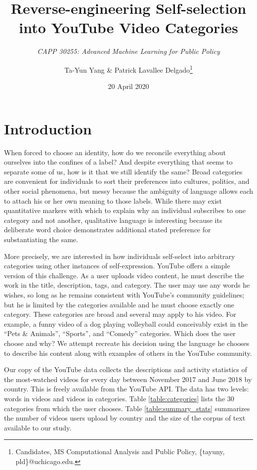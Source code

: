 \documentclass[letterpaper, 12pt]{article}
\title{Reverse-engineering Self-selection into YouTube Video Categories}
\subtitle{\textit{CAPP 30255: Advanced Machine Learning for Public Policy}}
\author{Ta-Yun Yang \& Patrick Lavallee Delgado\thanks{Candidates, MS Computational Analysis and Public Policy, \{tayuny, pld\}@uchicago.edu.}}
\date{20 April 2020}
\begin{document}
\maketitle

\section{Introduction}

When forced to choose an identity, how do we reconcile everything about ourselves into the confines of a label? And despite everything that seems to separate some of us, how is it that we still identify the same? Broad categories are convenient for individuals to sort their preferences into cultures, politics, and other social phenomena, but messy because the ambiguity of language allows each to attach his or her own meaning to those labels. While there may exist quantitative markers with which to explain why an individual subscribes to one category and not another, qualitative language is interesting because its deliberate word choice demonstrates additional stated preference for substantiating the same.

More precisely, we are interested in how individuals self-select into arbitrary categories using other instances of self-expression. YouTube offers a simple version of this challenge. As a user uploads video content, he must describe the work in the title, description, tags, and category. The user may use any words he wishes, so long as he remains consistent with YouTube's community guidelines; but he is limited by the categories available and he must choose exactly one category. These categories are broad and several may apply to his video. For example, a funny video of a dog playing volleyball could conceivably exist in the ``Pets $\&$ Animals'', ``Sports'', and ``Comedy'' categories. Which does the user choose and why? We attempt recreate his decision using the language he chooses to describe his content along with examples of others in the YouTube community.

Our copy of the YouTube data collects the descriptions and activity statistics of the most-watched videos for every day between November 2017 and June 2018 by country. This is freely available from the YouTube API. The data has two levels: words in videos and videos in categories. Table \ref{table:categories} lists the 30  categories from which the user chooses. Table \ref{table:summary_stats} summarizes the number of videos users upload by country and the size of the corpus of text available to our study.
\end{document}

